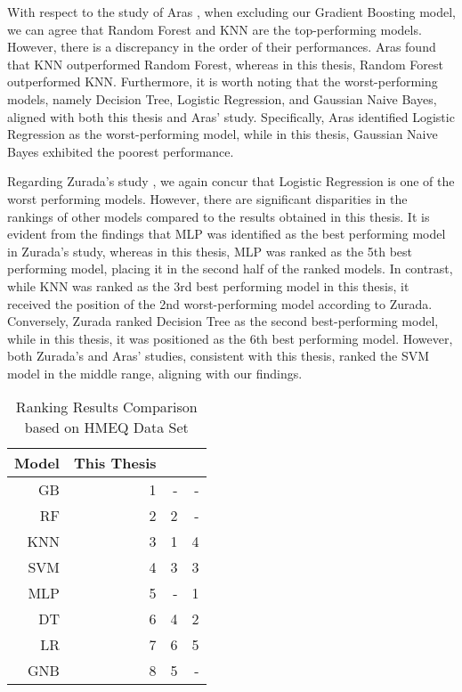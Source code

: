 With respect to the study of Aras \citep{serkan2021bagging}, when excluding our Gradient Boosting model, we can agree that Random Forest and KNN are the top-performing models. However, there is a discrepancy in the order of their performances. Aras found that KNN outperformed Random Forest, whereas in this thesis, Random Forest outperformed KNN.
Furthermore, it is worth noting that the worst-performing models, namely Decision Tree, Logistic Regression, and Gaussian Naive Bayes, aligned with both this thesis and Aras' study. Specifically, Aras identified Logistic Regression as the worst-performing model, while in this thesis, Gaussian Naive Bayes exhibited the poorest performance.

Regarding Zurada's study \citep{zurada2014classification}, we again concur that Logistic Regression is one of the worst performing models.
However, there are significant disparities in the rankings of other models compared to the results obtained in this thesis.
It is evident from the findings that MLP was identified as the best performing model in Zurada's study, whereas in this thesis, MLP was ranked as the 5th best performing model, placing it in the second half of the ranked models.
In contrast, while KNN was ranked as the 3rd best performing model in this thesis, it received the position of the 2nd worst-performing model according to Zurada.
Conversely, Zurada ranked Decision Tree as the second best-performing model, while in this thesis, it was positioned as the 6th best performing model.
However, both Zurada's and Aras' studies, consistent with this thesis, ranked the SVM model in the middle range, aligning with our findings.
\begin{table}[H]
    \small
    \setlength{\tabcolsep}{8pt}
    \renewcommand{\arraystretch}{1.3}
    \centering
        \caption[Ranking Results Comparison based on HMEQ Data Set]{Ranking Results Comparison based on HMEQ Data Set}\label{tab:comparisonfinal}
        \begin{tabular}{r r r r}
    \toprule
    \textbf{Model} & \textbf{This Thesis} & \textbf{\citep{serkan2021bagging}} & \textbf{\citep{zurada2014classification}}\\
    \midrule
    \hline
    GB & 1 & - & - \\ 
    RF & 2 & 2 & - \\ 
    KNN & 3 & 1 & 4 \\ 
    SVM & 4 & 3 & 3 \\ 
    MLP & 5 & - & 1 \\ 
    DT & 6 & 4 & 2 \\ 
    LR & 7 & 6 & 5 \\
    GNB & 8 & 5 & - \\
    \hline
    \bottomrule
    \end{tabular}
    \vspace{0.35em}

        \vspace{-1em}
\end{table}

